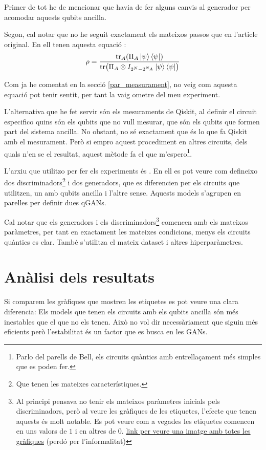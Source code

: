 Primer de tot he de mencionar que havia de fer alguns canvis al generador per acomodar aquests qubits ancilla. 

Segon, cal notar que no he seguit exactament els mateixos passos que en l'article original. En ell tenen aquesta equació \cite{QGAN_exp}: 
\begin{equation*}
\rho = \frac{\tr_A(\Pi_A \ket{\psi}\bra{\psi})}{\tr(\Pi_A\otimes I_{2^N-2^{N_A}}\ket{\psi}\bra{\psi})}
\end{equation*}

Com ja he comentat en la secció \ref{par_measurament}, no veig com aquesta equació pot tenir sentit, per tant la vaig ometre del meu experiment. 

L'alternativa que he fet servir són els mesuraments de Qiskit, al definir el circuit especifico quins són els qubits que no vull mesurar, que són els qubits que formen part del sistema ancilla. No obstant, no sé exactament que és lo que fa Qiskit amb el mesurament. Però si empro aquest procediment en altres circuits, dels quals n'en se el resultat, aquest mètode fa el que m'espero\footnote{Parlo del parells de Bell, els circuits quàntics amb entrellaçament més simples que es poden fer.}. 

L'arxiu que utilitzo per fer els experiments és . En ell es pot veure com defineixo dos discriminadors\footnote{Que tenen les mateixes característiques.} i dos generadors, que es diferencien per els circuits que utilitzen, un amb qubits ancilla i l'altre sense. Aquests models s'agrupen en parelles per definir dues qGANs. 

Cal notar que els generadors i els discriminadors\footnote{Al principi pensava no tenir els mateixos paràmetres inicials pels discriminadors, però al veure les gràfiques de les etiquetes, l'efecte que tenen aquests és molt notable. Es pot veure com a vegades les etiquetes comencen en uns valors de $1$ i en altres de $0$. \href{https://drive.google.com/file/d/1kYZ1vmNYU17sofNluXFYnoATLfY5B0jG/view?usp=sharing}{link per veure una imatge amb totes les gràfiques} (perdó per l'informalitat)} comencen amb els mateixos paràmetres, per tant en exactament les mateixes condicions, menys els circuits quàntics es clar. També s'utilitza el mateix dataset i altres hiperparàmetres. 

\section{Anàlisi dels resultats}
Si comparem les gràfiques que mostren les etiquetes es pot veure una clara diferencia: Els models que tenen els circuits amb els qubits ancilla són més inestables que el que no els tenen. Això no vol dir necessàriament que siguin més eficients però l'estabilitat és un factor que es busca en les GANs. 

